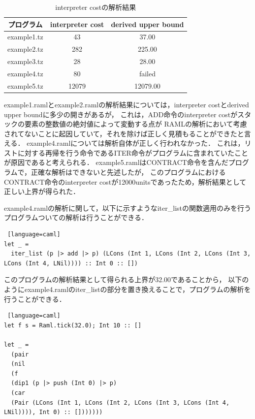 \documentclass{kuisthesis}
\begin{document}
\begin{table}[htb]
  \begin{center}
    \caption{interpreter costの解析結果}
    \begin{tabular}{|c|c|c|} \hline
      プログラム & interpreter cost & derived upper bound \\ \hline \hline
      example1.tz & 43 & 37.00 \\ \hline
      example2.tz & 282 & 225.00 \\ \hline
      example3.tz & 28 & 28.00 \\ \hline
      example4.tz & 80 & failed \\ \hline
      example5.tz & 12079 & 12079.00 \\ \hline
    \end{tabular}
    \label{table1}
  \end{center}
\end{table}

example1.ramlとexample2.ramlの解析結果については，interpreter costとderived upper boundに多少の開きがあるが，
これは，ADD命令のinterpreter costがスタックの要素の整数値の絶対値によって変動する点が
RAMLの解析において考慮されてないことに起因していて，それを除けば正しく見積もることができたと言える．
example4.ramlについては解析自体が正しく行われなかった．
これは，リストに対する再帰を行う命令であるITER命令がプログラムに含まれていたことが原因であると考えられる．
example5.ramlはCONTRACT命令を含んだプログラムで，正確な解析はできないと先述したが，
このプログラムにおけるCONTRACT命令のinterpreter costが12000unitsであったため，解析結果として正しい上界が得られた．

example4.ramlの解析に関して，以下に示すようなiter\_listの関数適用のみを行うプログラムついての解析は行うことができる．
\begin{lstlisting} [language=caml]
let _ =
  iter_list (p |> add |> p) (LCons (Int 1, LCons (Int 2, LCons (Int 3, LCons (Int 4, LNil)))) :: Int 0 :: [])
\end{lstlisting}
このプログラムの解析結果として得られる上界が32.00であることから，
以下のようにexample4.ramlのiter\_listの部分を置き換えることで，プログラムの解析を行うことができる．
\begin{lstlisting} [language=caml]
let f s = Raml.tick(32.0); Int 10 :: []

let _ =
  (pair
  (nil
  (f
  (dip1 (p |> push (Int 0) |> p)
  (car
  (Pair (LCons (Int 1, LCons (Int 2, LCons (Int 3, LCons (Int 4, LNil)))), Int 0) :: []))))))
\end{lstlisting}
\end{document}
